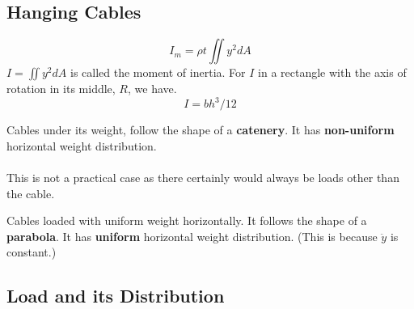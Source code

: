 \subsection{Hanging Cables}
\begin{equation}
    I_m = \rho t\iint y^2 dA
\end{equation}
$I = \iint y^2 dA$ is called the moment of inertia. For $I$ in a rectangle with the axis of rotation in its middle, $R$, we have.
\begin{equation}
    I = bh^3/12
\end{equation}
\begin{minipage}{0.55\textwidth}
\begin{definition} 
    Cables under its weight, follow the shape of a \textbf{catenery}. It has \textbf{non-uniform} horizontal weight distribution. 
\end{definition}
\paragraph{} This is not a practical case as there certainly would always be loads other than the cable.
\end{minipage}
\begin{minipage}{0.05\textwidth}
    \hspace{\textwidth}
\end{minipage}
\begin{minipage}{0.4\textwidth}
\noindent
{}
\end{minipage}
\begin{definition} 
    Cables loaded with uniform weight horizontally. It follows the shape of a \textbf{parabola}. It has \textbf{uniform} horizontal weight distribution. (This is because $\ddot{y}$ is constant.)
\end{definition}

\subsection{Load and its Distribution}
